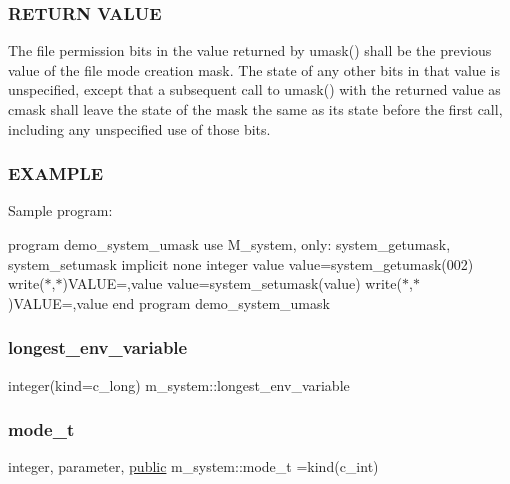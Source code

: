 \subsubsection*{R\+E\+T\+U\+RN V\+A\+L\+UE}

The file permission bits in the value returned by umask() shall be the previous value of the file mode creation mask. The state of any other bits in that value is unspecified, except that a subsequent call to umask() with the returned value as cmask shall leave the state of the mask the same as its state before the first call, including any unspecified use of those bits.

\subsubsection*{E\+X\+A\+M\+P\+LE}

Sample program\+:

program demo\+\_\+system\+\_\+umask use M\+\_\+system, only\+: system\+\_\+getumask, system\+\_\+setumask implicit none integer value value=system\+\_\+getumask(002) write($\ast$,$\ast$)\textquotesingle{}V\+A\+L\+UE=\textquotesingle{},value value=system\+\_\+setumask(value) write($\ast$,$\ast$)\textquotesingle{}V\+A\+L\+UE=\textquotesingle{},value end program demo\+\_\+system\+\_\+umask \mbox{\label{namespacem__system_ac066b6866f8ef4b8c358ec8daca7566c}} 
\subsubsection{\texorpdfstring{longest\+\_\+env\+\_\+variable}{longest\_env\_variable}}
{\footnotesize\ttfamily integer(kind=c\+\_\+long) m\+\_\+system\+::longest\+\_\+env\+\_\+variable\hspace{0.3cm}{\ttfamily [private]}}

\mbox{\label{namespacem__system_abdb5cc27c945379d844db4830d499050}} 
\subsubsection{\texorpdfstring{mode\+\_\+t}{mode\_t}}
{\footnotesize\ttfamily integer, parameter, \hyperlink{M__stopwatch_83_8txt_a2f74811300c361e53b430611a7d1769f}{public} m\+\_\+system\+::mode\+\_\+t =kind(c\+\_\+int)}

